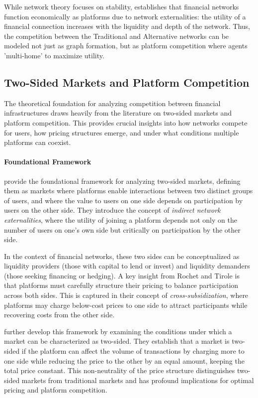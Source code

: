 While network theory focuses on stability,  establishes that financial networks function economically as platforms due to network externalities: the utility of a financial connection increases with the liquidity and depth of the network. Thus, the competition between the Traditional and Alternative networks can be modeled not just as graph formation, but as platform competition where agents 'multi-home' to maximize utility.

\subsection{Two-Sided Markets and Platform Competition}

The theoretical foundation for analyzing competition between financial infrastructures draws heavily from the literature on two-sided markets and platform competition. This provides crucial insights into how networks compete for users, how pricing structures emerge, and under what conditions multiple platforms can coexist.

\paragraph{Foundational Framework}

 provide the foundational framework for analyzing two-sided markets, defining them as markets where platforms enable interactions between two distinct groups of users, and where the value to users on one side depends on participation by users on the other side. They introduce the concept of \textit{indirect network externalities}, where the utility of joining a platform depends not only on the number of users on one's own side but critically on participation by the other side.

In the context of financial networks, these two sides can be conceptualized as liquidity providers (those with capital to lend or invest) and liquidity demanders (those seeking financing or hedging). A key insight from Rochet and Tirole is that platforms must carefully structure their pricing to balance participation across both sides. This is captured in their concept of \textit{cross-subsidization}, where platforms may charge below-cost prices to one side to attract participants while recovering costs from the other side.

 further develop this framework by examining the conditions under which a market can be characterized as two-sided. They establish that a market is two-sided if the platform can affect the volume of transactions by charging more to one side while reducing the price to the other by an equal amount, keeping the total price constant. This non-neutrality of the price structure distinguishes two-sided markets from traditional markets and has profound implications for optimal pricing and platform competition.

